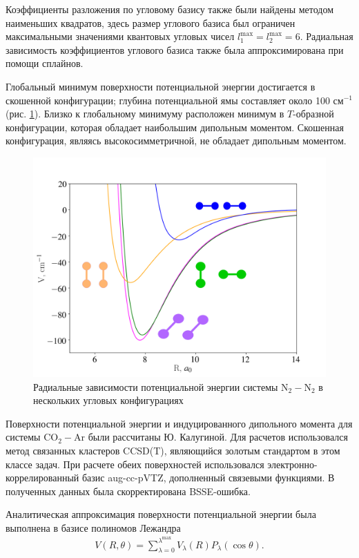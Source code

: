 Коэффициенты разложения по угловому базису также были найдены методом наименьших квадратов, здесь размер углового базиса был ограничен максимальными значениями квантовых угловых чисел $l_1^\text{max} = l_2^\text{max} = 6$. Радиальная зависимость коэффициентов углового базиса также была аппроксимирована при помощи сплайнов. \par
Глобальный минимум поверхности потенциальной энергии достигается в скошенной конфигурации; глубина потенциальной ямы составляет около 100 см$^{-1}$ (рис. \ref{fig:n2n2-potential-curves}). Близко к глобальному минимуму расположен минимум в $T$-образной конфигурации, которая обладает наибольшим дипольным моментом. Скошенная конфигурация, являясь высокосимметричной, не обладает дипольным моментом. 

\setcounter{figure}{8}
\begin{figure}[H]
    \centering
    \includegraphics[width=0.75\linewidth]{./pictures/n2n2_potential.png}
    \caption{Радиальные зависимости потенциальной энергии системы N$_2-$N$_2$ в нескольких угловых конфигурациях}
    \label{fig:n2n2-potential-curves}
\end{figure}

Поверхности потенциальной энергии и индуцированного дипольного момента для системы CO$_2-$Ar были рассчитаны Ю. Калугиной. Для расчетов использовался метод связанных кластеров CCSD(T), являющийся золотым стандартом в этом классе задач. При расчете обеих поверхностей использовался электронно-коррелированный базис aug-cc-pVTZ, дополненный связевыми функциями. В полученных данных была скорректирована BSSE-ошибка. \par
Аналитическая аппроксимация поверхности потенциальной энергии была выполнена в базисе полиномов Лежандра
\begin{gather}
    V(R, \theta) = \sum_{\lambda = 0}^{\lambda^\text{max}} V_\lambda(R) P_\lambda(\cos \theta). \label{co2-ar-expansion}
\end{gather}

